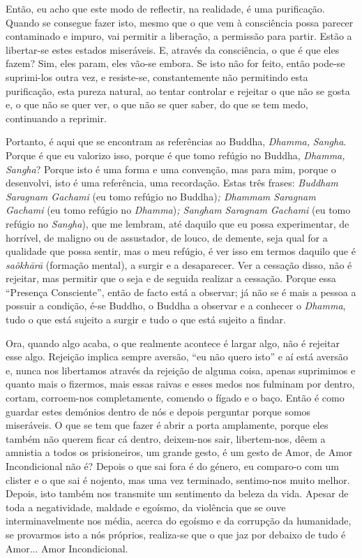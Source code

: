 Então, eu acho que este modo de reflectir, na realidade, é uma
purificação. Quando se consegue fazer isto, mesmo que o que vem à
consciência possa parecer contaminado e impuro, vai permitir a
liberação, a permissão para partir. Estão a libertar-se estes estados
miseráveis. E, através da consciência, o que é que eles fazem? Sim, eles
param, eles vão-se embora. Se isto não for feito, então pode-se
suprimi-los outra vez, e resiste-se, constantemente não permitindo esta
purificação, esta pureza natural, ao tentar controlar e rejeitar o que
não se gosta e, o que não se quer ver, o que não se quer saber, do que
se tem medo, continuando a reprimir.

Portanto, é aqui que se encontram as referências ao Buddha,
\emph{Dhamma,} \emph{Sangha}. Porque é que eu valorizo isso, porque é
que tomo refúgio no Buddha, \emph{Dhamma,} \emph{Sangha}? Porque isto é
uma forma e uma convenção, mas para mim, porque o desenvolvi, isto é uma
referência, uma recordação. Estas três frases: \emph{Buddham Saragnam
Gachami} (eu tomo refúgio no Buddha)\emph{; Dhammam Saragnam Gachami}
(eu tomo refúgio no \emph{Dhamma})\emph{; Sangham Saragnam Gachami} (eu
tomo refúgio no \emph{Sangha}), que me lembram, até daquilo que eu possa
experimentar, de horrível, de maligno ou de assustador, de louco, de
demente, seja qual for a qualidade que possa sentir, mas o meu refúgio,
é ver isso em termos daquilo que é \emph{saõkhārā} (formação mental), a
surgir e a desaparecer. Ver a cessação disso, não é rejeitar, mas
permitir que o seja e de seguida realizar a cessação. Porque essa
``Presença Consciente'', então de facto está a observar; já não se é
mais a pessoa a possuir a condição, é-se Buddho, o Buddha a observar e a
conhecer o \emph{Dhamma}, tudo o que está sujeito a surgir e tudo o que
está sujeito a findar.

Ora, quando algo acaba, o que realmente acontece é largar algo, não é
rejeitar esse algo. Rejeição implica sempre aversão, ``eu não quero
isto'' e aí está aversão e, nunca nos libertamos através da rejeição de
alguma coisa, apenas suprimimos e quanto mais o fizermos, mais essas
raivas e esses medos nos fulminam por dentro, cortam, corroem-nos
completamente, comendo o fígado e o baço. Então é como guardar estes
demónios dentro de nós e depois perguntar porque somos miseráveis. O que
se tem que fazer é abrir a porta amplamente, porque eles também não
querem ficar cá dentro, deixem-nos sair, libertem-nos, dêem a amnistia a
todos os prisioneiros, um grande gesto, é um gesto de Amor, de Amor
Incondicional não é? Depois o que sai fora é do género, eu comparo-o com
um clister e o que sai é nojento, mas uma vez terminado, sentimo-nos
muito melhor. Depois, isto também nos transmite um sentimento da beleza
da vida. Apesar de toda a negatividade, maldade e egoísmo, da violência
que se ouve interminavelmente nos média, acerca do egoísmo e da
corrupção da humanidade, se provarmos isto a nós próprios, realiza-se
que o que jaz por debaixo de tudo é Amor... Amor Incondicional.

